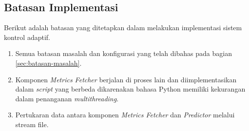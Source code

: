\subsection{Batasan Implementasi}
Berikut adalah batasan yang ditetapkan dalam melakukan implementasi sistem kontrol adaptif.
\begin{enumerate}
  \item Semua batasan masalah dan konfigurasi yang telah dibahas pada bagian \ref{sec:batasan-masalah}.
  \item Komponen \textit{Metrics Fetcher} berjalan di proses lain dan diimplementasikan dalam \textit{script} yang berbeda dikarenakan bahasa Python memiliki kekurangan dalam penanganan \textit{multithreading}.
  \item Pertukaran data antara komponen \textit{Metrics Fetcher} dan \textit{Predictor} melalui stream file.
\end{enumerate}